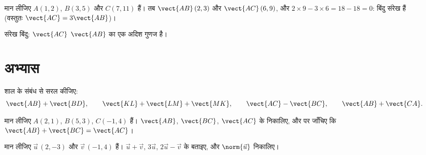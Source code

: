 \begin{example}\label{ex:g10:vectors:alignment}
मान लीजिए $A(1, 2)$, $B(3, 5)$ और $C(7, 11)$ हैं। तब $\vect{AB}\,(2, 3)$ और $\vect{AC}\,(6, 9)$, और $2 \times 9 - 3 \times 6 = 18 - 18 = 0$: बिंदु
संरेख हैं (वस्तुतः $\vect{AC} = 3\vect{AB}$)।
\end{example}

\begin{omfigure}

{\small संरेख बिंदु: $\vect{AC}$ $\vect{AB}$ का एक अदिश गुणज है।}
\end{omfigure}

\section{अभ्यास}

\begin{exercise}[$\star$]\label{exo:g10:vectors:1}
शाल के संबंध से सरल कीजिए:
\[
\vect{AB} + \vect{BD}, \qquad
\vect{KL} + \vect{LM} + \vect{MK}, \qquad
\vect{AC} - \vect{BC}, \qquad
\vect{AB} + \vect{CA}.
\]
\end{exercise}

\begin{exercise}[$\star$]\label{exo:g10:vectors:2}
मान लीजिए $A(2, 1)$, $B(5, 3)$, $C(-1, 4)$ हैं। $\vect{AB}$, $\vect{BC}$, $\vect{AC}$ के 
निकालिए, और  पर जाँचिए कि $\vect{AB} + \vect{BC} = \vect{AC}$।
\end{exercise}

\begin{exercise}[$\star$]\label{exo:g10:vectors:3}
मान लीजिए $\vec u\,(2, -3)$ और $\vec v\,(-1, 4)$ हैं। $\vec u + \vec v$, $3\vec u$, $2\vec u - \vec v$ के  बताइए, और
$\norm{\vec u}$ निकालिए।
\end{exercise}

